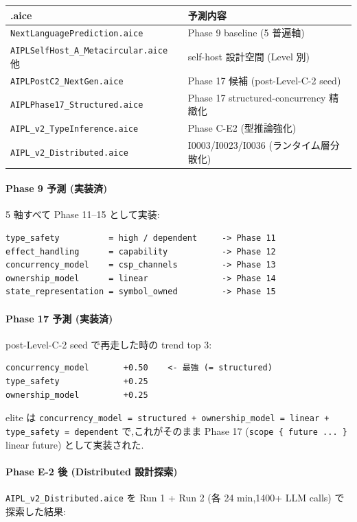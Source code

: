 \documentclass[11pt,a4paper]{article}
\begin{document}
\begin{center}
\begin{tabular}{ll}
\toprule
.aice & 予測内容 \\
\midrule
\texttt{NextLanguagePrediction.aice} & Phase 9 baseline (5 普遍軸) \\
\texttt{AIPLSelfHost\_A\_Metacircular.aice} 他 & self-host 設計空間 (Level 別) \\
\texttt{AIPLPostC2\_NextGen.aice} & Phase 17 候補 (post-Level-C-2 seed) \\
\texttt{AIPLPhase17\_Structured.aice} & Phase 17 structured-concurrency 精緻化 \\
\texttt{AIPL\_v2\_TypeInference.aice} & Phase C-E2 (型推論強化) \\
\texttt{AIPL\_v2\_Distributed.aice} & I0003/I0023/I0036 (ランタイム層分散化) \\
\bottomrule
\end{tabular}
\end{center}

\paragraph{Phase 9 予測 (実装済)}
5 軸すべて Phase 11--15 として実装:

\begin{lstlisting}
type_safety          = high / dependent     -> Phase 11
effect_handling      = capability           -> Phase 12
concurrency_model    = csp_channels         -> Phase 13
ownership_model      = linear               -> Phase 14
state_representation = symbol_owned         -> Phase 15
\end{lstlisting}

\paragraph{Phase 17 予測 (実装済)}
post-Level-C-2 seed で再走した時の trend top 3:

\begin{lstlisting}
concurrency_model       +0.50    <- 最強 (= structured)
type_safety             +0.25
ownership_model         +0.25
\end{lstlisting}

elite は \texttt{concurrency\_model = structured + ownership\_model = linear +
type\_safety = dependent} で,これがそのまま Phase 17 (\texttt{scope \{ future ... \}}
linear future) として実装された.

\paragraph{Phase E-2 後 (Distributed 設計探索)}
\texttt{AIPL\_v2\_Distributed.aice} を Run 1 + Run 2 (各 24 min,1400+ LLM calls)
で探索した結果:
\end{document}
